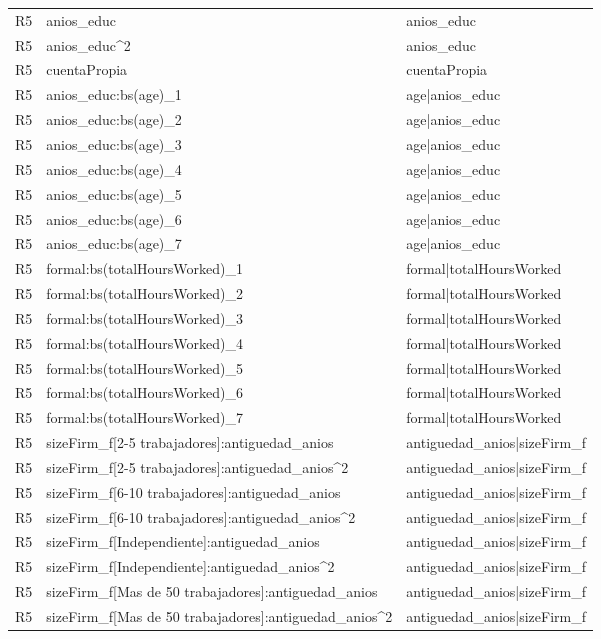 \begin{longtable}{lll}
R5 & anios\_educ & anios\_educ \\
R5 & anios\_educ\textasciicircum 2 & anios\_educ \\
R5 & cuentaPropia & cuentaPropia \\
R5 & anios\_educ:bs(age)\_1 & age|anios\_educ \\
R5 & anios\_educ:bs(age)\_2 & age|anios\_educ \\
R5 & anios\_educ:bs(age)\_3 & age|anios\_educ \\
R5 & anios\_educ:bs(age)\_4 & age|anios\_educ \\
R5 & anios\_educ:bs(age)\_5 & age|anios\_educ \\
R5 & anios\_educ:bs(age)\_6 & age|anios\_educ \\
R5 & anios\_educ:bs(age)\_7 & age|anios\_educ \\
R5 & formal:bs(totalHoursWorked)\_1 & formal|totalHoursWorked \\
R5 & formal:bs(totalHoursWorked)\_2 & formal|totalHoursWorked \\
R5 & formal:bs(totalHoursWorked)\_3 & formal|totalHoursWorked \\
R5 & formal:bs(totalHoursWorked)\_4 & formal|totalHoursWorked \\
R5 & formal:bs(totalHoursWorked)\_5 & formal|totalHoursWorked \\
R5 & formal:bs(totalHoursWorked)\_6 & formal|totalHoursWorked \\
R5 & formal:bs(totalHoursWorked)\_7 & formal|totalHoursWorked \\
R5 & sizeFirm\_f[2-5 trabajadores]:antiguedad\_anios & antiguedad\_anios|sizeFirm\_f \\
R5 & sizeFirm\_f[2-5 trabajadores]:antiguedad\_anios\textasciicircum 2 & antiguedad\_anios|sizeFirm\_f \\
R5 & sizeFirm\_f[6-10 trabajadores]:antiguedad\_anios & antiguedad\_anios|sizeFirm\_f \\
R5 & sizeFirm\_f[6-10 trabajadores]:antiguedad\_anios\textasciicircum 2 & antiguedad\_anios|sizeFirm\_f \\
R5 & sizeFirm\_f[Independiente]:antiguedad\_anios & antiguedad\_anios|sizeFirm\_f \\
R5 & sizeFirm\_f[Independiente]:antiguedad\_anios\textasciicircum 2 & antiguedad\_anios|sizeFirm\_f \\
R5 & sizeFirm\_f[Mas de 50 trabajadores]:antiguedad\_anios & antiguedad\_anios|sizeFirm\_f \\
R5 & sizeFirm\_f[Mas de 50 trabajadores]:antiguedad\_anios\textasciicircum 2 & antiguedad\_anios|sizeFirm\_f \\

\end{longtable}

